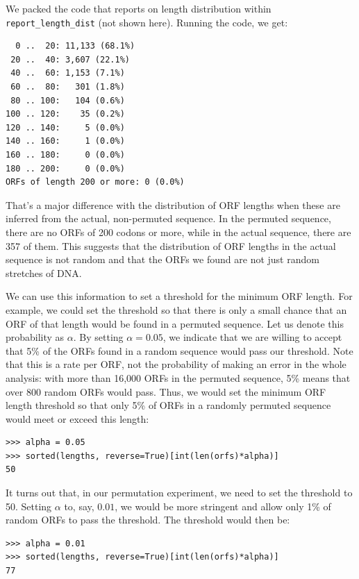 We packed the code that reports on length distribution within \texttt{report\_length\_dist} (not shown here). Running the code, we get:

\vspace*{3mm}
\begin{lstlisting}
  0 ..  20: 11,133 (68.1%)
 20 ..  40: 3,607 (22.1%)
 40 ..  60: 1,153 (7.1%)
 60 ..  80:   301 (1.8%)
 80 .. 100:   104 (0.6%)
100 .. 120:    35 (0.2%)
120 .. 140:     5 (0.0%)
140 .. 160:     1 (0.0%)
160 .. 180:     0 (0.0%)
180 .. 200:     0 (0.0%)
ORFs of length 200 or more: 0 (0.0%)
\end{lstlisting}

That's a major difference with the distribution of ORF lengths when these are inferred from the actual, non-permuted sequence. In the permuted sequence, there are no ORFs of 200 codons or more, while in the actual sequence, there are 357 of them. This suggests that the distribution of ORF lengths in the actual sequence is not random and that the ORFs we found are not just random stretches of DNA.

We can use this information to set a threshold for the minimum ORF length. For example, we could set the threshold so that there is only a small chance that an ORF of that length would be found in a permuted sequence. Let us denote this probability as $\alpha$. By setting $\alpha = 0.05$, we indicate that we are willing to accept that 5\% of the ORFs found in a random sequence would pass our threshold. Note that this is a rate per ORF, not the probability of making an error in the whole analysis: with more than 16,000 ORFs in the permuted sequence, 5\% means that over 800 random ORFs would pass. Thus, we would set the minimum ORF length threshold so that only 5\% of ORFs in a randomly permuted sequence would meet or exceed this length:

\vspace*{3mm}
\begin{lstlisting}
>>> alpha = 0.05
>>> sorted(lengths, reverse=True)[int(len(orfs)*alpha)]
50
\end{lstlisting}

It turns out that, in our permutation experiment, we need to set the threshold to 50. Setting $\alpha$ to, say, $0.01$, we would be more stringent and allow only 1\% of random ORFs to pass the threshold. The threshold would then be:

\vspace*{3mm}
\begin{lstlisting}
>>> alpha = 0.01
>>> sorted(lengths, reverse=True)[int(len(orfs)*alpha)]
77
\end{lstlisting}

